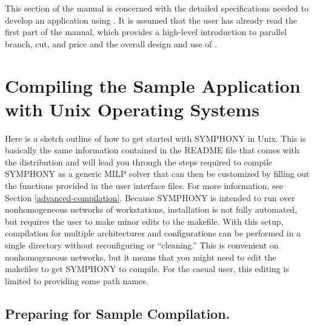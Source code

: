 This section of the manual is concerned with the detailed
specifications needed to develop an application using \BB. It is
assumed that the user has already read the first part of the manual, which
provides a high-level introduction to parallel branch, cut, and price
and the overall design and use of \BB. 


\section{Compiling the Sample Application with Unix Operating Systems}
\label{getting_started_unix}

Here is a sketch outline of how to get started with SYMPHONY in Unix. This is
basically the same information contained in the README file that comes with
the distribution and will lead you through the steps required to compile
SYMPHONY as a generic MILP solver that can then be customized by filling out
the functions provided in the user interface files. For more information, see
Section \ref{advanced-compilation}. Because SYMPHONY is intended to run over
nonhomogeneous networks of workstations, installation is not fully automated,
but requires the user to make minor edits to the makefile.  With this setup,
compilation for multiple architectures and configurations can be performed in
a single directory without reconfiguring or ``cleaning.'' This is convenient
on nonhomogeneous networks, but it means that you might need to edit the
makefiles to get SYMPHONY to compile. For the casual user, this editing is
limited to providing some path names.

\subsection{Preparing for Sample Compilation.}


